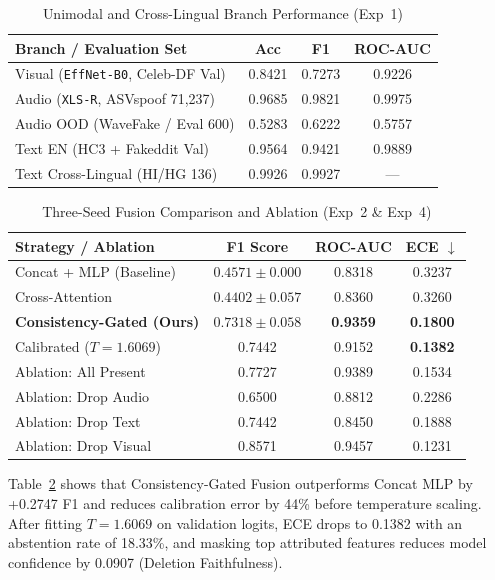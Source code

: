 \documentclass[conference]{IEEEtran}
\begin{document}
\begin{table}[htbp]
\caption{Unimodal and Cross-Lingual Branch Performance (Exp~1)}
\label{tab:unimodal}
\centering
\begin{tabular}{@{}lccc@{}}
\toprule
\textbf{Branch / Evaluation Set} & \textbf{Acc} & \textbf{F1} & \textbf{ROC-AUC} \\
\midrule
Visual (\texttt{EffNet-B0}, Celeb-DF Val) & 0.8421 & 0.7273 & 0.9226 \\
Audio (\texttt{XLS-R}, ASVspoof 71,237) & 0.9685 & 0.9821 & 0.9975 \\
Audio OOD (WaveFake / Eval 600) & 0.5283 & 0.6222 & 0.5757 \\
Text EN (HC3 + Fakeddit Val) & 0.9564 & 0.9421 & 0.9889 \\
Text Cross-Lingual (HI/HG 136) & 0.9926 & 0.9927 & --- \\
\bottomrule
\end{tabular}
\end{table}

\begin{table}[htbp]
\caption{Three-Seed Fusion Comparison and Ablation (Exp~2 \& Exp~4)}
\label{tab:fusion}
\centering
\begin{tabular}{@{}lccc@{}}
\toprule
\textbf{Strategy / Ablation} & \textbf{F1 Score} & \textbf{ROC-AUC} & \textbf{ECE $\downarrow$} \\
\midrule
Concat + MLP (Baseline) & $0.4571 \pm 0.000$ & 0.8318 & 0.3237 \\
Cross-Attention & $0.4402 \pm 0.057$ & 0.8360 & 0.3260 \\
\textbf{Consistency-Gated (Ours)} & $\mathbf{0.7318 \pm 0.058}$ & \textbf{0.9359} & \textbf{0.1800} \\
\midrule
Calibrated ($T = 1.6069$) & 0.7442 & 0.9152 & \textbf{0.1382} \\
\midrule
Ablation: All Present & 0.7727 & 0.9389 & 0.1534 \\
Ablation: Drop Audio & 0.6500 & 0.8812 & 0.2286 \\
Ablation: Drop Text & 0.7442 & 0.8450 & 0.1888 \\
Ablation: Drop Visual & 0.8571 & 0.9457 & 0.1231 \\
\bottomrule
\end{tabular}
\end{table}

Table~\ref{tab:fusion} shows that Consistency-Gated Fusion outperforms Concat MLP by +0.2747 F1 and reduces calibration error by 44\% before temperature scaling. After fitting $T = 1.6069$ on validation logits, ECE drops to 0.1382 with an abstention rate of 18.33\%, and masking top attributed features reduces model confidence by 0.0907 (Deletion Faithfulness).
\end{document}
